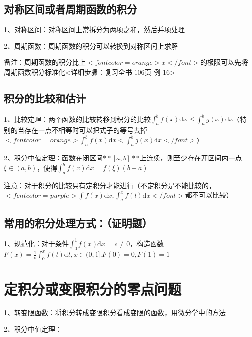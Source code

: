 \subsection{对称区间或者周期函数的积分}

1、对称区间：对称区间上常拆分为两项之和，然后并项处理

2、周期函数：周期函数的积分可以转换到对称区间上求解

备注：周期函数的积分比上$ <font color=orange>x</font> $的极限可以先将周期函数积分标准化<详细步骤：复习全书 106页 例 16>



\subsection{积分的比较和估计}

1、比较定理：两个函数的比较转移到积分的比较$ \int_{a}^{b} f(x) \mathrm{d} x \leqslant \int_{a}^{b} g(x) \mathrm{d} x $（特别的当存在一点不相等时可以把式子的等号去掉$ <font color=orange>\int_{a}^{b} f(x) \mathrm{d} x<\int_{a}^{b} g(x) \mathrm{d} x</font> $）

2、积分中值定理：函数在闭区间$ **[a,b]** $上连续，则至少存在开区间内一点$ \xi \in (a,b) $，使得$ \int_{a}^{b} f(x) \mathrm{d} x=f(\xi)(b-a) $

注意：对于积分的比较只有定积分才能进行（不定积分是不能比较的，$ <font color=purple>\int f(x) \mathrm{d} x,\int_{a}^{x} f(t) \mathrm{d}x</font> $都不可以比较）



\subsection{常用的积分处理方式：（证明题）}

1、规范化：对于条件$ \int_{0}^{1} f(x) \mathrm{d} x=c \neq 0 $，构造函数$ F(x)=\frac{1}{c} \int_{0}^{x} f(t) \mathrm{d} t, x \in(0,1] . F(0)=0, F(1)=1 $

\section{定积分或变限积分的零点问题}

1、转变限函数：将积分转成变限积分看成变限的函数，用微分学中的方法

2、积分中值定理：

